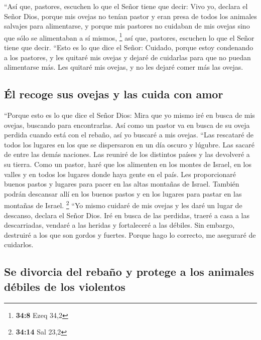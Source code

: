  ``Así que, pastores, escuchen lo que el Señor tiene que
decir:  Vivo yo, declara el Señor Dios, porque mis ovejas
no tenían pastor y eran presa de todos los animales salvajes para
alimentarse, y porque mis pastores no cuidaban de mis ovejas sino que
sólo se alimentaban a sí mismos, \footnote{\textbf{34:8} Ezeq 34,2}
 así que, pastores, escuchen lo que el Señor tiene que
decir.  ``Esto es lo que dice el Señor: Cuidado, porque
estoy condenando a los pastores, y les quitaré mis ovejas y dejaré de
cuidarlas para que no puedan alimentarse más. Les quitaré mis ovejas, y
no les dejaré comer más las ovejas.

\hypertarget{uxe9l-recoge-sus-ovejas-y-las-cuida-con-amor}{%
\subsection{Él recoge sus ovejas y las cuida con
amor}\label{uxe9l-recoge-sus-ovejas-y-las-cuida-con-amor}}

 ``Porque esto es lo que dice el Señor Dios: Mira que yo
mismo iré en busca de mis ovejas, buscando para encontrarlas.
 Así como un pastor va en busca de su oveja perdida
cuando está con el rebaño, así yo buscaré a mis ovejas. ``Las rescataré
de todos los lugares en los que se dispersaron en un día oscuro y
lúgubre.  Las sacaré de entre las demás naciones. Las
reuniré de los distintos países y las devolveré a su tierra. Como un
pastor, haré que los alimenten en los montes de Israel, en los valles y
en todos los lugares donde haya gente en el país.  Les
proporcionaré buenos pastos y lugares para pacer en las altas montañas
de Israel. También podrán descansar allí en los buenos pastos y en los
lugares para pastar en las montañas de Israel. \footnote{\textbf{34:14}
  Sal 23,2}  ``Yo mismo cuidaré de mis ovejas y les daré
un lugar de descanso, declara el Señor Dios.  Iré en
busca de las perdidas, traeré a casa a las descarriadas, vendaré a las
heridas y fortaleceré a las débiles. Sin embargo, destruiré a los que
son gordos y fuertes. Porque hago lo correcto, me aseguraré de
cuidarlos.

\hypertarget{se-divorcia-del-rebauxf1o-y-protege-a-los-animales-duxe9biles-de-los-violentos}{%
\subsection{Se divorcia del rebaño y protege a los animales débiles de
los
violentos}\label{se-divorcia-del-rebauxf1o-y-protege-a-los-animales-duxe9biles-de-los-violentos}}

